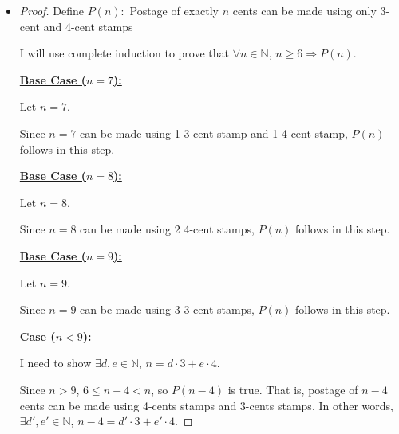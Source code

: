 \documentclass[12pt]{article}
\begin{document}
\begin{itemize}
    \item

    \bigskip
    \begin{proof}
    \setcounter{equation}{0}
    Define $P(n):$ Postage of exactly $n$ cents can be made using only 3-cent
    and 4-cent stamps

    \bigskip

    I will use complete induction to prove that $\forall n \in \mathbb{N}$, $n \geq 6 \Rightarrow P(n)$.

    \bigskip

    \underline{\textbf{Base Case ($n = 7$):}}

    \bigskip

    Let $n = 7$.

    \bigskip

    Since $n = 7$ can be made using 1 3-cent stamp and 1 4-cent stamp, $P(n)$
    follows in this step.

    \bigskip

    \underline{\textbf{Base Case ($n = 8$):}}

    \bigskip

    Let $n = 8$.

    \bigskip

    Since $n = 8$ can be made using 2 4-cent stamps, $P(n)$
    follows in this step.

    \bigskip

    \underline{\textbf{Base Case ($n = 9$):}}

    \bigskip

    Let $n = 9$.

    \bigskip

    Since $n = 9$ can be made using 3 3-cent stamps, $P(n)$
    follows in this step.

    \bigskip

    \underline{\textbf{Case ($n < 9$):}}

    \bigskip

    I need to show $\exists d,e \in \mathbb{N}$, $n = d \cdot 3 + e \cdot 4$.

    \bigskip

    Since $n > 9$, $6 \leq n - 4 < n$, so $P(n-4)$ is true. That is,
    postage of $n-4$ cents can be made using 4-cents stamps and 3-cents stamps.
    In other words, $\exists d',e' \in \mathbb{N}$, $n-4 = d' \cdot 3 + e' \cdot 4$.

    \bigskip


\end{proof}
\end{itemize}
\end{document}
